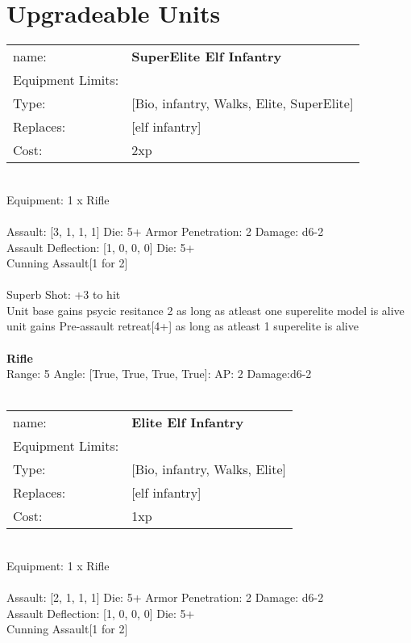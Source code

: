\pagebreak\section{Upgradeable Units}\noindent
\begin{tabular}{ll}
name: &{\bf SuperElite Elf Infantry } \\
Equipment Limits: & \\
Type: &[Bio, infantry, Walks, Elite, SuperElite] \\
Replaces: &[elf infantry] \\
Cost: & 2xp\\
\end{tabular}
\ \\
Equipment: 1 x Rifle \\
\ \\
Assault: [3, 1, 1, 1] Die: 5+ Armor Penetration: 2 Damage: d6-2 \\
Assault Deflection: [1, 0, 0, 0] Die: 5+\\
\indent Cunning Assault[1 for 2]\\ 
 
\ \\
Superb Shot: +3 to hit\\ 
Unit base gains psycic resitance 2 as long as atleast one superelite model is alive\\ 
unit gains Pre-assault retreat[4+] as long as atleast 1 superelite is alive\\ 

\ \\
{\bf Rifle } \\



Range: 5  Angle: [True, True, True, True]: AP: 2 Damage:d6-2 \\




 
\ \\

\noindent
\begin{tabular}{ll}
name: &{\bf Elite Elf Infantry } \\
Equipment Limits: & \\
Type: &[Bio, infantry, Walks, Elite] \\
Replaces: &[elf infantry] \\
Cost: & 1xp\\
\end{tabular}
\ \\
Equipment: 1 x Rifle \\
\ \\
Assault: [2, 1, 1, 1] Die: 5+ Armor Penetration: 2 Damage: d6-2 \\
Assault Deflection: [1, 0, 0, 0] Die: 5+\\
\indent Cunning Assault[1 for 2]\\ 
 
